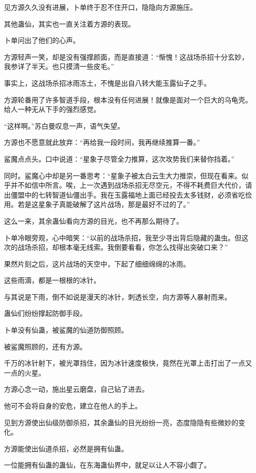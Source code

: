 \begin{this_body}
见方源久久没有进展，卜单终于忍不住开口，隐隐向方源施压。

其他蛊仙，其实也一直关注着方源的表现。

卜单问出了他们的心声。

方源轻声一笑，却是没有强撑颜面，而是直接道：“惭愧！这战场杀招十分玄妙，我参详了半天。也只摸清一些皮毛。”

事实上，这战场杀招冰雨冻土，不愧是出自八转大能玉露仙子之手。

方源轮番用了许多智道手段，根本没有任何进展！就像是面对一个巨大的乌龟壳。给人一种无从下手的强烈感觉。

“这样啊。”苏白曼叹息一声，语气失望。

方源也不愿意就此放弃：“再给我一段时间，我再继续推算一番。”

鲨魔点点头。口中说道：“星象子尽管全力推算，这次攻势我们来替你挡着。”

同时。鲨魔心中却是另一番思考：“星象子被太白云生大力推崇，但现在看来。似乎并不如信中所言。唉，上一次遇到战场杀招无尽空元，不得不耗费巨大代价，请出僵盟中的七转智道仙僵出手。我在玉露福地上面已经投去太多钱财，必须省吃俭用。若是这星象子真能破解了这片战场，那是最好不过的了。”

这么一来，其余蛊仙看向方源的目光，也不再那么期待了。

卜单冷眼旁观，心中暗笑：“以前的战场杀招，我至少寻出背后隐藏的蛊虫。但这次的战场杀招，却根本毫无线索。我倒要看看，你怎么找得出突破口来？”

果然片刻之后，这片战场的天空中，下起了细细绵绵的冰雨。

这些雨滴，都是一根根的冰针。

与其说是下雨，倒不如说是漫天的冰针，刺透长空，向方源等人暴射而来。

蛊仙们纷纷撑起防御手段。

卜单没有仙蛊，被鲨魔的仙道防御照顾。

被鲨魔照顾的，还有方源。

千万的冰针射下，被光罩挡住，因为冰针速度极快，竟然在光罩上击打出了一点又一点的火星。

方源心念一动，施出星云磨盘，自己钻了进去。

他可不会将自身的安危，建立在他人的手上。

见到方源使出仙级防御杀招，其余蛊仙的目光纷纷一亮，态度隐隐有些微妙的变化。

方源能使出仙道杀招，必然是拥有仙蛊。

一位能拥有仙蛊的蛊仙，在东海蛊仙界中，就足以让人不容小觑了。


\end{this_body}
